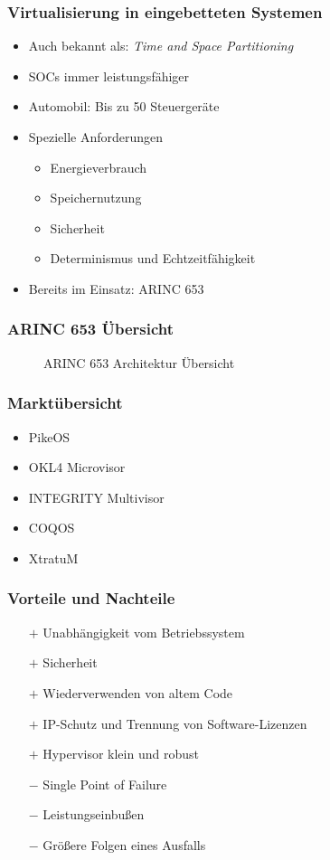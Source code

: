 \documentclass[]{beamer}
\newcommand{\inputImage}[1]{}
\begin{document}
\begin{frame}
\frametitle{Virtualisierung in eingebetteten Systemen}
    \begin{itemize}
        \item Auch bekannt als: \emph{Time and Space Partitioning}
        \item SOCs immer leistungsfähiger
        \item Automobil: Bis zu 50 Steuergeräte
        \item Spezielle Anforderungen
        \begin{itemize}
            \item Energieverbrauch
            \item Speichernutzung
            \item Sicherheit
            \item Determinismus und Echtzeitfähigkeit
        \end{itemize}
        \item Bereits im Einsatz: ARINC 653
    \end{itemize}
\end{frame}


\begin{frame}
\frametitle{ARINC 653 Übersicht}
    \begin{figure}[ht]
        \centering
        \resizebox{0.65\linewidth}{!}{\inputImage{arinc653.dia}}
        \caption{ARINC 653 Architektur Übersicht}
        \label{fig:arinc_653}
    \end{figure}
\end{frame}

\begin{frame}
\frametitle{Marktübersicht}
    \begin{itemize}
        \item PikeOS
        \item OKL4 Microvisor
        \item INTEGRITY Multivisor
        \item COQOS
        \item XtratuM
    \end{itemize}
\end{frame}

\begin{frame}
\frametitle{Vorteile und Nachteile}
    \begin{itemize}
        \item[$ + $] Unabhängigkeit vom Betriebssystem
        \item[$ + $] Sicherheit
        \item[$ + $] Wiederverwenden von altem Code
        \item[$ + $] IP-Schutz und Trennung von Software-Lizenzen
        \item[$ + $] Hypervisor klein und robust

        \item[$ - $] Single Point of Failure
        \item[$ - $] Leistungseinbußen
        \item[$ - $] Größere Folgen eines Ausfalls
    \end{itemize}
\end{frame}
\end{document}
